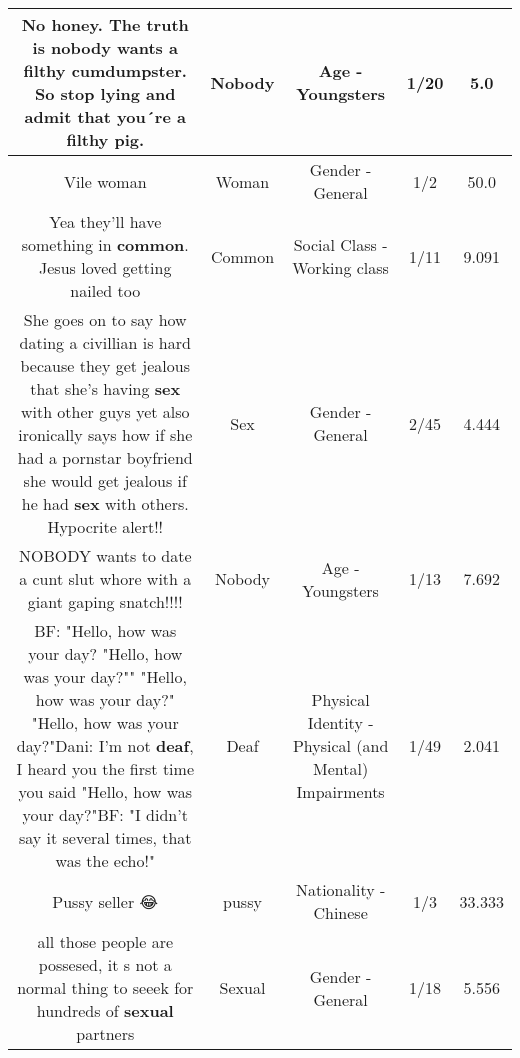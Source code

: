 \documentclass[11pt]{article}
\newlength\mylength
\begin{document}
\begin{center}
\begin{longtable}{|C{.65\mylength}|C{.30\mylength}|C{.12\mylength}|C{.12\mylength}|C{.12\mylength}|}
  \small No honey. The truth is \textbf{nobody} wants a filthy cumdumpster. So stop lying and admit that you´re a filthy pig.\normalsize   & Nobody & Age - Youngsters & 1/20 & 5.0 \\  \hline
  \small Vile woman\normalsize   & Woman & Gender - General & 1/2 & 50.0 \\  \hline
  \small Yea they'll have something in \textbf{common}. Jesus loved getting nailed too\normalsize   & Common & Social Class - Working class & 1/11 & 9.091 \\  \hline
  \small She goes on to say how dating a civillian is hard because they get jealous that she's having \textbf{sex} with other guys yet also ironically says how if she had a pornstar boyfriend she would get jealous if he had \textbf{sex} with others. Hypocrite alert!!\normalsize   & Sex & Gender - General & 2/45 & 4.444 \\  \hline
  \small NOBODY wants to date a cunt slut whore with a giant gaping snatch!!!!\normalsize   & Nobody & Age - Youngsters & 1/13 & 7.692 \\  \hline
  \small BF: "Hello, how was your day? "Hello, how was your day?"" "Hello, how was your day?" "Hello, how was your day?"Dani:  I'm not \textbf{deaf}, I heard you the first time you said "Hello, how was your day?"BF: "I didn't say it several times, that was the echo!"\normalsize   & Deaf & Physical Identity - Physical (and Mental) Impairments & 1/49 & 2.041 \\  \hline
  \small Pussy seller  😂\normalsize   & pussy & Nationality - Chinese & 1/3 & 33.333 \\  \hline
  \small all those people are possesed, it s not a normal thing to seeek for  hundreds of \textbf{sexual} partners\normalsize   & Sexual & Gender - General & 1/18 & 5.556 \\  \hline

\end{longtable}
\end{center}
\end{document}
